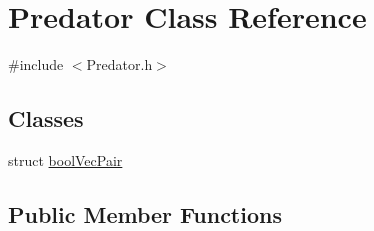 \hypertarget{class_predator}{}\section{Predator Class Reference}
\label{class_predator}


{\ttfamily \#include $<$Predator.\+h$>$}

\subsection*{Classes}
\begin{DoxyCompactItemize}
\item 
struct \mbox{\hyperlink{struct_predator_1_1bool_vec_pair}{bool\+Vec\+Pair}}
\end{DoxyCompactItemize}
\subsection*{Public Member Functions}
